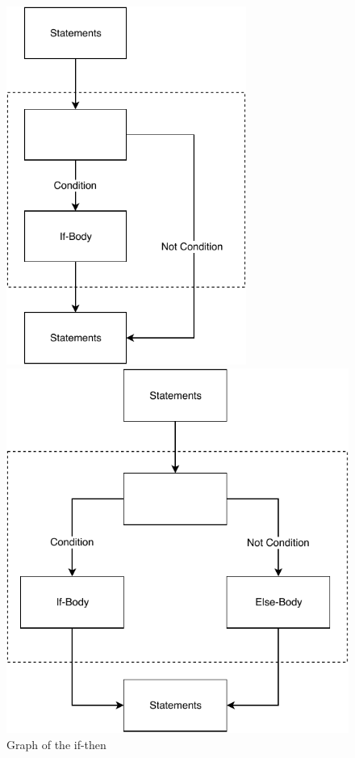 \begin{figure}[ht]
  \centering
  \begin{minipage}[h]{0.45\textwidth}
  	\centering
    \includegraphics[width=0.7\textwidth]{images/if}
    \caption{Graph of the if-then}
    \label{fig:cfg_if}
  \end{minipage}
  \hfill
  \begin{minipage}[h]{0.45\textwidth}
  	\centering
    \includegraphics[width=\textwidth]{images/if-else}

\end{minipage}
\end{figure}
